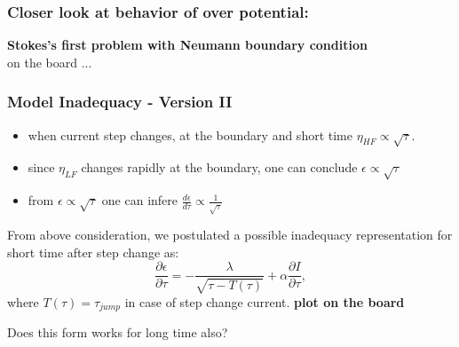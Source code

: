 \documentclass[10pt,xcolor=dvipsnames,compress]{beamer}
\begin{document}
\begin{frame}
\frametitle{Closer look at behavior of over potential:}
\vfill

\begin{center}
\textbf{\large Stokes's first problem with Neumann boundary condition}\\
on the board ...
\end{center}

\vfill
\end{frame}


\begin{frame}
\frametitle{Model Inadequacy - Version II}
\vfill

\begin{itemize}
\item when current step changes, at the boundary and short time $\eta_{HF} \propto \sqrt{\tau}$.
\item since $\eta_{LF}$ changes rapidly at the boundary, one can conclude $\epsilon \propto \sqrt{\tau}$
\item from $\epsilon \propto \sqrt{\tau}$ one can infere $\frac{d\epsilon}{d\tau} \propto \frac{1}{\sqrt{\tau}}$
\end{itemize}

From above consideration, we postulated a possible inadequacy representation for short time after step change  as: 
\begin{equation*}
\frac{\partial\epsilon}{\partial\tau} = -\frac{\lambda}{\sqrt{\tau - {T}(\tau)}} + \alpha \frac{\partial I}{\partial\tau},
\end{equation*}
where ${T}(\tau) = \tau_{jump}$ in case of step change current. \textbf{plot on the board}

\begin{center}
Does this form works for long time also?
\end{center}

\vfill
\end{frame}
\end{document}
